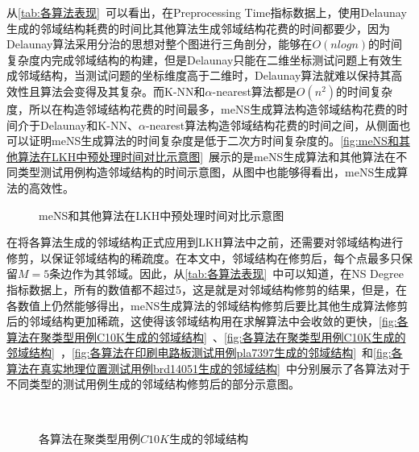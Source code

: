 \par
{\color{red}
从\autoref{tab:各算法表现}~可以看出，在Preprocessing Time指标数据上，使用Delaunay生成的邻域结构耗费的时间比其他算法生成邻域结构花费的时间都要少，因为Delaunay算法采用分治的思想对整个图进行三角剖分，能够在$O(nlogn)$的时间复杂度内完成邻域结构的构建，但是Delaunay只能在二维坐标测试问题上有效生成邻域结构，当测试问题的坐标维度高于二维时，Delaunay算法就难以保持其高效性且算法会变得及其复杂。而K-NN和$\alpha$-nearest算法都是$O(n^2)$的时间复杂度，所以在构造邻域结构花费的时间最多，meNS生成算法构造邻域结构花费的时间介于Delaunay和K-NN、$\alpha$-nearest算法构造邻域结构花费的时间之间，从侧面也可以证明meNS生成算法的时间复杂度是低于二次方时间复杂度的。\autoref{fig:meNS和其他算法在LKH中预处理时间对比示意图}~展示的是meNS生成算法和其他算法在不同类型测试用例构造邻域结构的时间示意图，从图中也能够得看出，meNS生成算法的高效性。
}
\begin{figure}[htb]
    \caption[meNS和其他算法在LKH中预处理时间对比示意图]{meNS和其他算法在LKH中预处理时间对比示意图}
    \label{fig:meNS和其他算法在LKH中预处理时间对比示意图}
\end{figure}
\par
在将各算法生成的邻域结构正式应用到LKH算法中之前，还需要对邻域结构进行修剪，以保证邻域结构的稀疏度。在本文中，邻域结构在修剪后，每个点最多只保留$M=5$条边作为其邻域。因此，从\autoref{tab:各算法表现}~中可以知道，在NS Degree指标数据上，所有的数值都不超过5，这是就是对邻域结构修剪的结果，但是，在各数值上仍然能够得出，meNS生成算法的邻域结构修剪后要比其他生成算法修剪后的邻域结构更加稀疏，这使得该邻域结构用在求解算法中会收敛的更快，\autoref{fig:各算法在聚类型用例C10K生成的邻域结构}~、\autoref{fig:各算法在聚类型用例C10K生成的邻域结构}~，\autoref{fig:各算法在印刷电路板测试用例pla7397生成的邻域结构}~和\autoref{fig:各算法在真实地理位置测试用例brd14051生成的邻域结构}~中分别展示了各算法对于不同类型的测试用例生成的邻域结构修剪后的部分示意图。
\begin{figure}[!htb]
     \\
    \caption[各算法在聚类型用例$C10K$生成的邻域结构]{各算法在聚类型用例$C10K$生成的邻域结构}
    \label{fig:各算法在聚类型用例C10K生成的邻域结构}
\end{figure}
